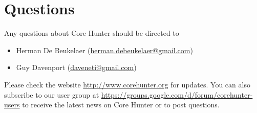 \documentclass[a4paper, titlepage, 11pt]{article}
\begin{document}
\section{Questions}

Any questions about Core Hunter should be directed to
\begin{itemize}

	\item Herman De Beukelaer (\href{mailto:herman.debeukelaer@gmail.com}{herman.debeukelaer@gmail.com})

	\item Guy Davenport (\href{mailto:daveneti@gmail.com}{daveneti@gmail.com})

\end{itemize}

Please check the website \url{http://www.corehunter.org} for updates. You can also subscribe to our user group at \url{https://groups.google.com/d/forum/corehunter-users} to receive the latest news on Core Hunter or to post questions.
\end{document}

